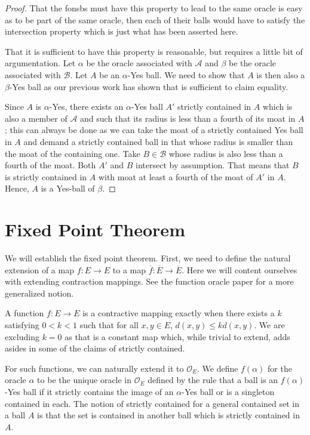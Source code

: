 \documentclass[12pt]{article}
\begin{document}
\begin{proof}
That the fonsbs must have this property to lead to the same oracle is easy as to be part of the same oracle, then each of their balls would have to satisfy the intersection property which is just what has been asserted here. 

That it is sufficient to have this property is reasonable, but requires a little bit of argumentation. Let $\alpha$ be the oracle associated with $\mathcal{A}$ and $\beta$ be the oracle associated with $\mathcal{B}$. Let $A$ be an $\alpha$-Yes ball. We need to show that $A$ is then also a $\beta$-Yes ball as our previous work has shown that is sufficient to claim equality. 

Since $A$ is $\alpha$-Yes, there exists an $\alpha$-Yes ball $A'$ strictly contained in $A$ which is also a member of $\mathcal{A}$ and such that its radius is less than a fourth of its moat in $A$; this can always be done as we can take the moat of a strictly contained Yes ball in $A$ and demand a strictly contained ball in that whose radius is smaller than the moat of the containing one. Take $B \in \mathcal{B}$ whose radius is also less than a fourth of the moat. Both $A'$ and $B$ intersect by assumption. That means that $B$ is strictly contained in $A$ with moat at least a fourth of the moat of $A'$ in $A$. Hence, $A$ is a Yes-ball of $\beta$.
\end{proof}


\section{Fixed Point Theorem}

We will establish the fixed point theorem. First, we need to define the natural extension of a map $f: E \to E$ to a map $\overline{f} : \overline{E} \to \overline{E}$. Here we will content ourselves with extending contraction mappings. See the function oracle paper \cite{taylor23funora} for a more generalized notion. 

A function $f: E \to E$ is a contractive mapping exactly when there exists a $k$ satisfying $0 < k < 1$ such that for all $x, y \in E$, $d(x,y) \leq k d(x,y)$. We are excluding $k=0$ as that is a constant map which, while trivial to extend, adds asides in some of the claims of strictly contained. 

For such functions, we can naturally extend it to $\mathcal{O}_E$. We define $f(\alpha)$ for the oracle $\alpha$ to be the unique oracle in $\mathcal{O}_E$ defined by the rule that a ball is an $f(\alpha)$-Yes ball if it strictly contains the image of an $\alpha$-Yes ball or is a singleton contained in each. The notion of strictly contained for a general contained set in a ball $A$ is that the set is contained in another ball which is strictly contained in $A$. 
\end{document}

